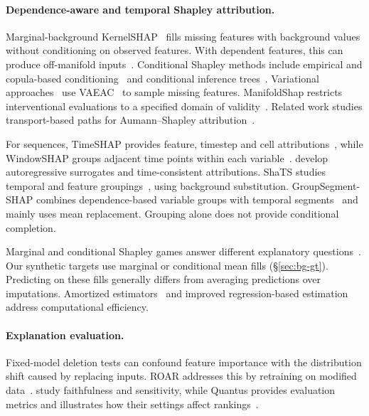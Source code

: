 \paragraph{Dependence-aware and temporal Shapley attribution.}
Marginal-background KernelSHAP~\citep{lundberg2017unified} fills missing
features with background values without conditioning on observed features.
With dependent features, this can produce off-manifold
inputs~\citep{frye2021shapley}. Conditional Shapley methods include
empirical and copula-based conditioning~\citep{aas2021explaining,aas2021vineexplaining}
and conditional inference trees~\citep{redelmeier2020explaining}.
Variational approaches~\citep{olsen2022using} use
VAEAC~\citep{ivanov2018variational} to sample missing features.
ManifoldShap restricts interventional evaluations to a specified domain
of validity~\citep{taufiq2023manifold}. Related work studies transport-based
paths for Aumann--Shapley attribution~\citep{zhang2026axiomatic}.

For sequences, TimeSHAP provides feature, timestep and cell
attributions~\citep{bento2021timeshap}, while WindowSHAP groups adjacent
time points within each variable~\citep{NAYEBI2023104438}.
\citet{villani2022feature} develop autoregressive surrogates and
time-consistent attributions. ShaTS studies temporal and feature
groupings~\citep{de2025shats}, using background substitution.
GroupSegment-SHAP combines dependence-based variable groups with temporal
segments~\citep{kim2026groupsegment} and mainly uses mean replacement.
Grouping alone does not provide conditional completion.

Marginal and conditional Shapley games answer different explanatory
questions~\citep{janzing2020feature,chen2020true,sundararajan2020many,kumar2020problems}.
Our synthetic targets use marginal or conditional mean fills
(\S\ref{sec:bg-gt}). Predicting on these fills generally differs from
averaging predictions over imputations.
Amortized estimators~\citep{jethani2022fastshap} and improved
regression-based estimation~\citep{covert2021improving} address
computational efficiency.

\paragraph{Explanation evaluation.}
Fixed-model deletion tests can confound feature importance with the
distribution shift caused by replacing inputs. ROAR addresses this by
retraining on modified data~\citep{hooker2019roar}.
\citet{bhatt2020evaluating} study faithfulness and sensitivity, while
Quantus provides evaluation metrics and illustrates how their settings
affect rankings~\citep{hedstrom2023quantus}.

